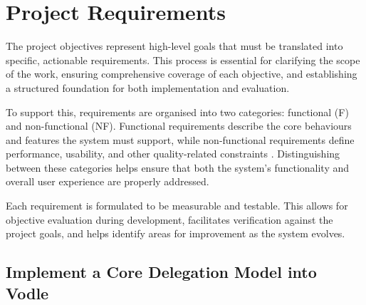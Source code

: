 \section{Project Requirements}
The project objectives represent high-level goals that must be translated into specific, actionable requirements. This process is essential for clarifying the scope of the work, ensuring comprehensive coverage of each objective, and establishing a structured foundation for both implementation and evaluation.

To support this, requirements are organised into two categories: functional (F) and non-functional (NF). Functional requirements describe the core behaviours and features the system must support, while non-functional requirements define performance, usability, and other quality-related constraints \citep{sommervill_2016}. Distinguishing between these categories helps ensure that both the system's functionality and overall user experience are properly addressed.

Each requirement is formulated to be measurable and testable. This allows for objective evaluation during development, facilitates verification against the project goals, and helps identify areas for improvement as the system evolves.

\subsection{Implement a Core Delegation Model into Vodle}\label{subsec:requirements_core}
